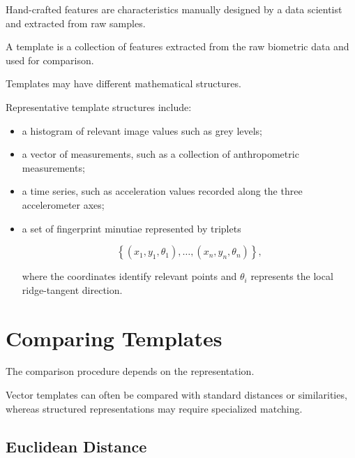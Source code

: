 \documentclass[11pt,a4paper,oneside]{report}
\newcommand{\set}[1]{\left\{ #1 \right\}}
\begin{document}
\begin{definitionbox}
Hand-crafted features are characteristics manually designed by a data
scientist and extracted from raw samples.
\end{definitionbox}

\begin{definitionbox}[ -- Template]
A template is a collection of features extracted from the raw biometric
data and used for comparison.
\end{definitionbox}

Templates may have different mathematical structures.

Representative template structures include:

\begin{itemize}
    \item a histogram of relevant image values such as grey levels;

    \item a vector of measurements, such as a collection of anthropometric
    measurements;

    \item a time series, such as acceleration values recorded along the
    three accelerometer axes;

    \item a set of fingerprint minutiae represented by triplets

    \[
        \set{
        (x_1,y_1,\theta_1),
        \ldots,
        (x_n,y_n,\theta_n)
        },
    \]

    where the coordinates identify relevant points and
    \(\theta_i\) represents the local ridge-tangent direction.
\end{itemize}

\section{Comparing Templates}
\label{subsec:template-comparison}

The comparison procedure depends on the representation.

Vector templates can often be compared with standard distances or
similarities, whereas structured representations may require specialized
matching.

\subsection{Euclidean Distance}
\end{document}
